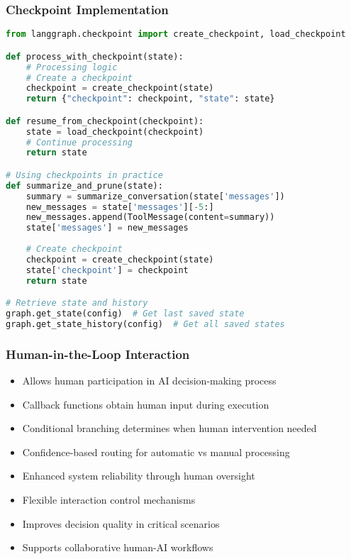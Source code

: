 \begin{frame}[fragile]\frametitle{Checkpoint Implementation}
      \begin{lstlisting}[language=Python, basicstyle=\tiny]
from langgraph.checkpoint import create_checkpoint, load_checkpoint

def process_with_checkpoint(state):
    # Processing logic
    # Create a checkpoint
    checkpoint = create_checkpoint(state)
    return {"checkpoint": checkpoint, "state": state}

def resume_from_checkpoint(checkpoint):
    state = load_checkpoint(checkpoint)
    # Continue processing
    return state

# Using checkpoints in practice
def summarize_and_prune(state):
    summary = summarize_conversation(state['messages'])
    new_messages = state['messages'][-5:]
    new_messages.append(ToolMessage(content=summary))
    state['messages'] = new_messages
    
    # Create checkpoint
    checkpoint = create_checkpoint(state)
    state['checkpoint'] = checkpoint
    return state

# Retrieve state and history
graph.get_state(config)  # Get last saved state
graph.get_state_history(config)  # Get all saved states
      \end{lstlisting}
\end{frame}

\begin{frame}[fragile]\frametitle{Human-in-the-Loop Interaction}
      \begin{itemize}
        \item Allows human participation in AI decision-making process
        \item Callback functions obtain human input during execution
        \item Conditional branching determines when human intervention needed
        \item Confidence-based routing for automatic vs manual processing
        \item Enhanced system reliability through human oversight
        \item Flexible interaction control mechanisms
        \item Improves decision quality in critical scenarios
        \item Supports collaborative human-AI workflows
      \end{itemize}
\end{frame}

